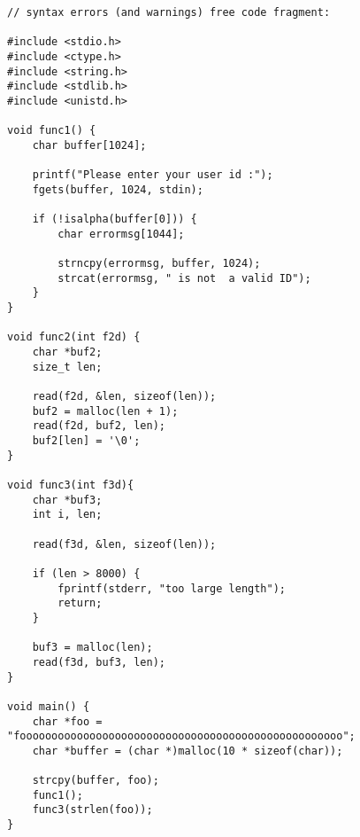 
\begin{lstlisting}
// syntax errors (and warnings) free code fragment:

#include <stdio.h>
#include <ctype.h>
#include <string.h>
#include <stdlib.h>
#include <unistd.h>

void func1() {	
    char buffer[1024];
    
    printf("Please enter your user id :");
    fgets(buffer, 1024, stdin);
     
    if (!isalpha(buffer[0])) {
        char errormsg[1044];
             
        strncpy(errormsg, buffer, 1024);
        strcat(errormsg, " is not  a valid ID");
 	}
}

void func2(int f2d) {
    char *buf2;
    size_t len;

    read(f2d, &len, sizeof(len));
    buf2 = malloc(len + 1);
    read(f2d, buf2, len);
    buf2[len] = '\0';
}

void func3(int f3d){
    char *buf3;
    int i, len;
         
    read(f3d, &len, sizeof(len));
         
    if (len > 8000) { 
        fprintf(stderr, "too large length"); 
        return; 
    }

    buf3 = malloc(len);
    read(f3d, buf3, len);    
}

void main() {
    char *foo = "fooooooooooooooooooooooooooooooooooooooooooooooooooo";
    char *buffer = (char *)malloc(10 * sizeof(char));
    
    strcpy(buffer, foo);
    func1();
    func3(strlen(foo));
}
\end{lstlisting}
